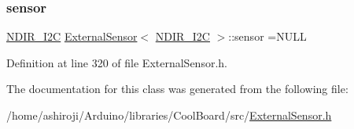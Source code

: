 \subsubsection{\texorpdfstring{sensor}{sensor}}
{\footnotesize\ttfamily \hyperlink{class_n_d_i_r___i2_c}{N\+D\+I\+R\+\_\+\+I2C} \hyperlink{class_external_sensor}{External\+Sensor}$<$ \hyperlink{class_n_d_i_r___i2_c}{N\+D\+I\+R\+\_\+\+I2C} $>$\+::sensor =N\+U\+LL\hspace{0.3cm}{\ttfamily [private]}}



Definition at line 320 of file External\+Sensor.\+h.



The documentation for this class was generated from the following file\+:\begin{DoxyCompactItemize}
\item 
/home/ashiroji/\+Arduino/libraries/\+Cool\+Board/src/\hyperlink{_external_sensor_8h}{External\+Sensor.\+h}\end{DoxyCompactItemize}
